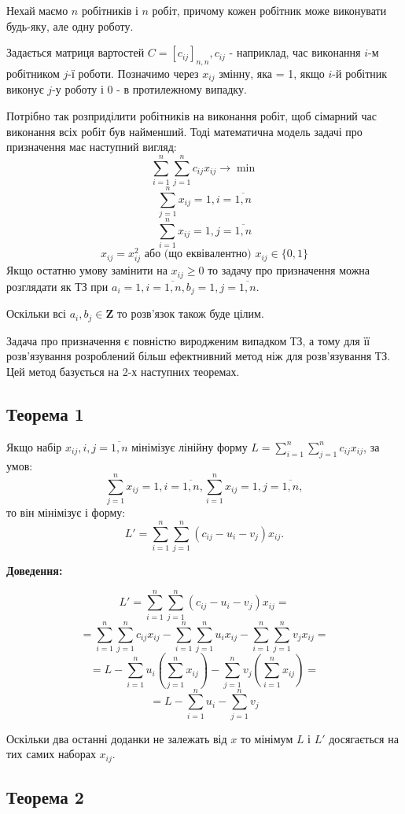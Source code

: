 \documentclass[12pt,a4paper]{book}
\begin{document}
Нехай маємо $n$ робітників і $n$ робіт, причому кожен робітник може виконувати будь-яку, але одну роботу.

Задається матриця вартостей $C=[c_{ij}]_{n,n}, c_{ij}$ - наприклад, час виконання $i$-м робітником $j$-ї роботи. Позначимо через $x_{ij}$ змінну, яка = 1, якщо $i$-й робітник виконує $j$-у роботу і 0 - в протилежному випадку.

Потрібно так розприділити робітників на виконання робіт, щоб сімарний час виконання всіх робіт був найменший. Тоді математична модель задачі про призначення має наступний вигляд:
\[ \sum_{i=1}^n \sum_{j=1}^n c_{ij} x_{ij} \to \min \]
\[ \sum_{j=1}^n x_{ij} = 1, i = \overline{1,n} \]
\[ \sum_{i=1}^n x_{ij} = 1, j = \overline{1,n} \]
\[ x_{ij} = x_{ij}^2 \mbox{ або (що еквівалентно) } x_{ij} \in \{0,1\} \]
Якщо остатню умову замінити на $x_{ij} \ge 0$ то задачу про призначення можна розглядати як ТЗ при $a_i=1, i = \overline{1,n}, b_j=1, j = \overline{1,n}$.

Оскільки всі $a_i, b_j \in \mathbf{Z}$ то розв’язок також буде цілим.

Задача про призначення є повністю виродженим випадком ТЗ, а тому для її розв’язування розроблений більш ефектнивний метод ніж для розв’язування ТЗ. Цей метод базується на 2-х наступних теоремах.

\subsection{Теорема 1}

Якщо набір $x_{ij}, i,j=\overline{1,n}$ мінімізує лінійну форму $ L = \sum_{i=1}^n \sum_{j=1}^n c_{ij} x_{ij} $, за умов:
\[ \sum_{j=1}^n x_{ij} = 1, i = \overline{1,n},  \sum_{i=1}^n x_{ij} = 1, j = \overline{1,n}, \]
то він мінімізує і форму:
\[ L' = \sum_{i=1}^n \sum_{j=1}^n (c_{ij} - u_i - v_j) x_{ij}. \]

{\bf Доведення:}

\[ L' = \sum_{i=1}^n \sum_{j=1}^n (c_{ij} - u_i - v_j) x_{ij} = \]
\[ = \sum_{i=1}^n \sum_{j=1}^n c_{ij} x_{ij} - \sum_{i=1}^n \sum_{j=1}^n u_i x_{ij} - \sum_{i=1}^n \sum_{j=1}^n v_j x_{ij} = \]
\[ = L - \sum_{i=1}^n u_i (\sum_{j=1}^n x_{ij}) - \sum_{j=1}^n v_j (\sum_{i=1}^n x_{ij}) = \]
\[ = L - \sum_{i=1}^n u_i - \sum_{j=1}^n v_j \]

Оскільки два останні доданки не залежать від $x$ то мінімум $L$ і $L'$ досягається на тих самих наборах $x_{ij}$.

\subsection{Теорема 2}
\end{document}
